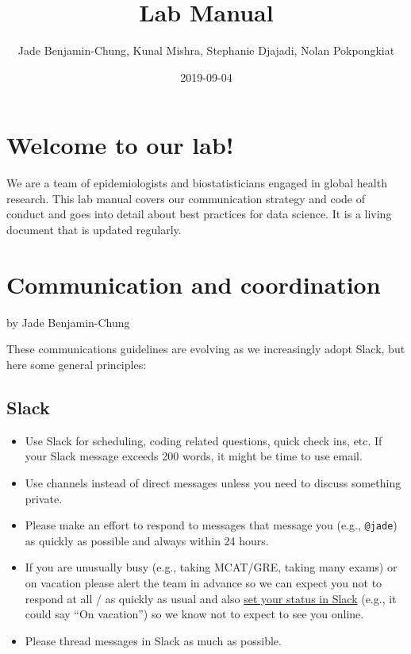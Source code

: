 \documentclass[]{book}
\title{Lab Manual}
\author{Jade Benjamin-Chung, Kunal Mishra, Stephanie Djajadi, Nolan Pokpongkiat}
\date{2019-09-04}
\providecommand{\tightlist}{%
  \setlength{\itemsep}{0pt}\setlength{\parskip}{0pt}}
\begin{document}
\maketitle

{
\setcounter{tocdepth}{1}
\tableofcontents
}
\hypertarget{welcome-to-our-lab}{%
\chapter{Welcome to our lab!}\label{welcome-to-our-lab}}

We are a team of epidemiologists and biostatisticians engaged in global health research. This lab manual covers our communication strategy and code of conduct and goes into detail about best practices for data science. It is a living document that is updated regularly.

\hypertarget{communication-and-coordination}{%
\chapter{Communication and coordination}\label{communication-and-coordination}}

by Jade Benjamin-Chung

These communications guidelines are evolving as we increasingly adopt Slack, but here some general principles:

\hypertarget{slack}{%
\section{Slack}\label{slack}}

\begin{itemize}
\tightlist
\item
  Use Slack for scheduling, coding related questions, quick check ins, etc. If your Slack message exceeds 200 words, it might be time to use email.
\item
  Use channels instead of direct messages unless you need to discuss something private.
\item
  Please make an effort to respond to messages that message you (e.g., \texttt{@jade}) as quickly as possible and always within 24 hours.
\item
  If you are unusually busy (e.g., taking MCAT/GRE, taking many exams) or on vacation please alert the team in advance so we can expect you not to respond at all / as quickly as usual and also \href{https://get.slack.help/hc/en-us/articles/201864558-Set-your-Slack-status-and-availability}{set your status in Slack} (e.g., it could say ``On vacation'') so we know not to expect to see you online.
\item
  Please thread messages in Slack as much as possible.
\end{itemize}
\end{document}
